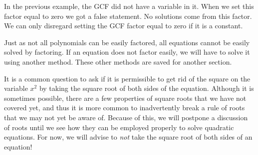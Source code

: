\documentclass[12pt]{book}
\theoremstyle{definition}
\begin{document}
In the previous example, the GCF did not have a variable in it. When we set this factor equal to zero we got a false statement. No solutions come from this factor. We can only disregard setting the GCF factor equal to zero if it is a constant.\par
Just as not all polynomials can be easily factored, all equations cannot be easily solved by factoring.  If an equation does not factor easily, we will have to solve it using another method. These other methods are saved for another section.\par
It is a common question to ask if it is permissible to get rid of the square on the variable $x^2$ by taking the square root of both sides of the equation. Although it is sometimes possible, there are a few properties of square roots that we have not covered yet, and thus it
is more common to inadvertently break a rule of roots that we may not yet be aware of.  Because of this, we will postpone a discussion of roots until we see how they can be employed properly to solve quadratic equations.  For now, we will advise to {\it not} take the
square root of both sides of an equation!
\end{document}
